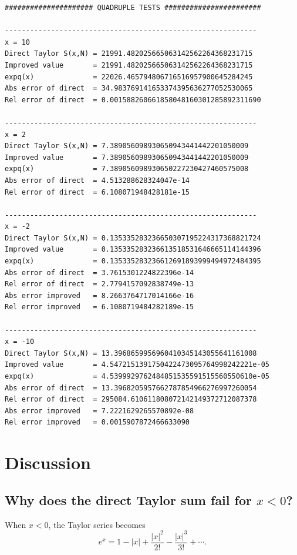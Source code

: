 \documentclass[12pt,a4paper]{article}
\begin{document}
\begin{lstlisting}
##################### QUADRUPLE TESTS #######################

------------------------------------------------------------
x = 10
Direct Taylor S(x,N) = 21991.482025665063142562264368231715
Improved value       = 21991.482025665063142562264368231715
expq(x)              = 22026.465794806716516957900645284245
Abs error of direct  = 34.983769141653374395636277052530065
Rel error of direct  = 0.001588260661858048160301285892311690

------------------------------------------------------------
x = 2
Direct Taylor S(x,N) = 7.389056098930650943441442201050009
Improved value       = 7.389056098930650943441442201050009
expq(x)              = 7.389056098930650227230427460575008
Abs error of direct  = 4.513288628324047e-14
Rel error of direct  = 6.108071948428181e-15

------------------------------------------------------------
x = -2
Direct Taylor S(x,N) = 0.135335283236650307195224317368821724
Improved value       = 0.135335283236613518531646665114144396
expq(x)              = 0.135335283236612691893999494972484395
Abs error of direct  = 3.7615301224822396e-14
Rel error of direct  = 2.7794157092838749e-13
Abs error improved   = 8.2663764717014166e-16
Rel error improved   = 6.1080719484282189e-15

------------------------------------------------------------
x = -10
Direct Taylor S(x,N) = 13.3968659956960410345143055641161008
Improved value       = 4.5472151391750422473095764998242221e-05
expq(x)              = 4.5399929762484851535591515560550610e-05
Abs error of direct  = 13.3968205957662787854966276997260054
Rel error of direct  = 295084.610611808072142149372712087378
Abs error improved   = 7.2221629265570892e-08
Rel error improved   = 0.0015907872466633090
\end{lstlisting}

\section{Discussion}

\subsection*{Why does the direct Taylor sum fail for \(x<0\)?}

When \(x<0\), the Taylor series becomes
\[
e^x = 1-|x|+\frac{|x|^2}{2!}-\frac{|x|^3}{3!}+\cdots.
\]
\end{document}
